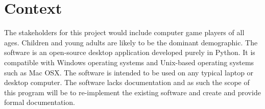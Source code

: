 \documentclass{article}
\begin{document}
	\section{Context}
	The stakeholders for this project would include computer game players of 
	all ages. Children and young adults are likely to be the dominant 
	demographic.
	\newline
	\newline
	The software is an open-source desktop application developed purely in 
	Python. It is compatible with Windows operating systems and Unix-based 
	operating systems such as Mac OSX. The software is intended to be used on 
	any typical laptop or desktop computer. The software lacks documentation 
	and as such the scope of this program will be to re-implement the existing 
	software and create and provide formal documentation.
	
\end{document}
